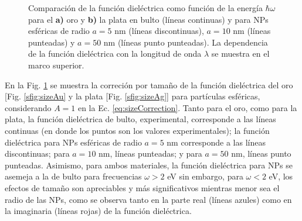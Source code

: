 \begin{figure}[h!]
\begin{subfigure}{.7\linewidth}
	\end{subfigure}\vspace*{-.7em}
	\caption{ Comparación de la función dieléctrica como función de la energía $\hbar\omega$ para el \textbf{a)}  oro y \textbf{b)} la plata en bulto (líneas continuas) y para NPs esféricas de radio $a=5$ nm (líneas discontinuas), $a=10$ nm (líneas punteadas) y $a=50$ nm (líneas punto punteadas). La dependencia de la función dieléctrica con la longitud de onda $\lambda$ se muestra en el marco superior.}\label{fig:sizeCorrection}
	\end{figure}	

%
%
%	
%	

En la Fig.  \ref{fig:sizeCorrection} se muestra la correción por tamaño de la función dieléctrica del oro [Fig. \ref{sfig:sizeAu} y la plata [Fig.  \ref{sfig:sizeAg}] para partículas esféricas, considerando $A=1$ en la Ec. \eqref{eq:sizeCorrection}. Tanto para el oro, como para la plata, la función dieléctrica de bulto, experimental, corresponde a las líneas continuas (en donde los puntos son los valores experimentales); la función dieléctrica para NPs esféricas de radio $a=5$ nm corresponde a las líneas discontinuas; para $a=10$ nm, líneas punteadas; y para $a=50$ nm, líneas punto punteadas. Asimismo, para ambos materiales, la función dieléctrica para NPs se asemeja a la de bulto para frecuencias $\omega>2$ eV sin embargo, para $\omega<2$ eV, los efectos de tamaño son apreciables y más significativos mientras menor sea el radio de las NPs, como se observa tanto  en la parte real (líneas azules) como en la imaginaria (líneas rojas) de la función dieléctrica.

